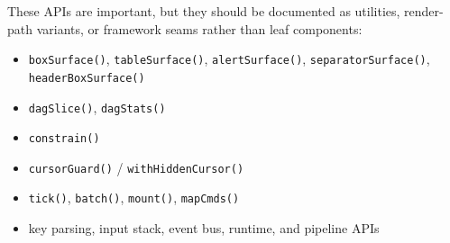 These APIs are important, but they should be documented as utilities, render-path variants, or framework seams rather than leaf components:

\begin{itemize}
\tightlist
\item
  \texttt{b\allowbreak{}o\allowbreak{}x\allowbreak{}S\allowbreak{}u\allowbreak{}r\allowbreak{}f\allowbreak{}a\allowbreak{}c\allowbreak{}e\allowbreak{}(\allowbreak{})}, \texttt{t\allowbreak{}a\allowbreak{}b\allowbreak{}l\allowbreak{}e\allowbreak{}S\allowbreak{}u\allowbreak{}r\allowbreak{}f\allowbreak{}a\allowbreak{}c\allowbreak{}e\allowbreak{}(\allowbreak{})}, \texttt{a\allowbreak{}l\allowbreak{}e\allowbreak{}r\allowbreak{}t\allowbreak{}S\allowbreak{}u\allowbreak{}r\allowbreak{}f\allowbreak{}a\allowbreak{}c\allowbreak{}e\allowbreak{}(\allowbreak{})}, \texttt{s\allowbreak{}e\allowbreak{}p\allowbreak{}a\allowbreak{}r\allowbreak{}a\allowbreak{}t\allowbreak{}o\allowbreak{}r\allowbreak{}S\allowbreak{}u\allowbreak{}r\allowbreak{}f\allowbreak{}a\allowbreak{}c\allowbreak{}e\allowbreak{}(\allowbreak{})}, \texttt{h\allowbreak{}e\allowbreak{}a\allowbreak{}d\allowbreak{}e\allowbreak{}r\allowbreak{}B\allowbreak{}o\allowbreak{}x\allowbreak{}S\allowbreak{}u\allowbreak{}r\allowbreak{}f\allowbreak{}a\allowbreak{}c\allowbreak{}e\allowbreak{}(\allowbreak{})}
\item
  \texttt{d\allowbreak{}a\allowbreak{}g\allowbreak{}S\allowbreak{}l\allowbreak{}i\allowbreak{}c\allowbreak{}e\allowbreak{}(\allowbreak{})}, \texttt{d\allowbreak{}a\allowbreak{}g\allowbreak{}S\allowbreak{}t\allowbreak{}a\allowbreak{}t\allowbreak{}s\allowbreak{}(\allowbreak{})}
\item
  \texttt{c\allowbreak{}o\allowbreak{}n\allowbreak{}s\allowbreak{}t\allowbreak{}r\allowbreak{}a\allowbreak{}i\allowbreak{}n\allowbreak{}(\allowbreak{})}
\item
  \texttt{c\allowbreak{}u\allowbreak{}r\allowbreak{}s\allowbreak{}o\allowbreak{}r\allowbreak{}G\allowbreak{}u\allowbreak{}a\allowbreak{}r\allowbreak{}d\allowbreak{}(\allowbreak{})} / \texttt{w\allowbreak{}i\allowbreak{}t\allowbreak{}h\allowbreak{}H\allowbreak{}i\allowbreak{}d\allowbreak{}d\allowbreak{}e\allowbreak{}n\allowbreak{}C\allowbreak{}u\allowbreak{}r\allowbreak{}s\allowbreak{}o\allowbreak{}r\allowbreak{}(\allowbreak{})}
\item
  \texttt{t\allowbreak{}i\allowbreak{}c\allowbreak{}k\allowbreak{}(\allowbreak{})}, \texttt{b\allowbreak{}a\allowbreak{}t\allowbreak{}c\allowbreak{}h\allowbreak{}(\allowbreak{})}, \texttt{m\allowbreak{}o\allowbreak{}u\allowbreak{}n\allowbreak{}t\allowbreak{}(\allowbreak{})}, \texttt{m\allowbreak{}a\allowbreak{}p\allowbreak{}C\allowbreak{}m\allowbreak{}d\allowbreak{}s\allowbreak{}(\allowbreak{})}
\item
  key parsing, input stack, event bus, runtime, and pipeline APIs
\end{itemize}

